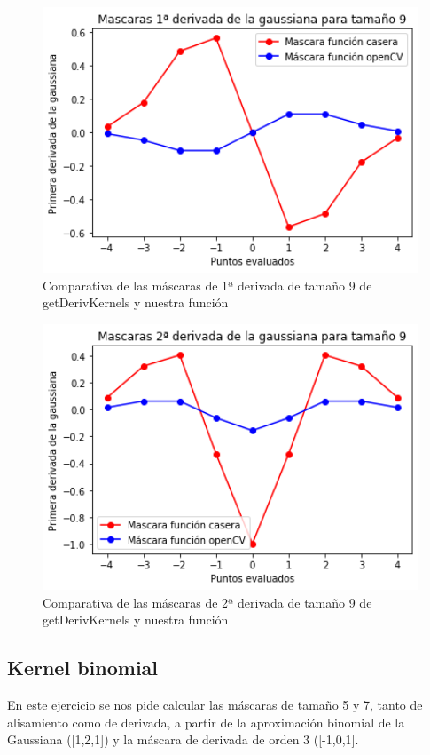 \documentclass[12pt,spanish]{article}
\begin{document}
\begin{figure}[H]
	\centering
	\includegraphics[width=12cm]{./imagenes_memoria/1d_t9.png}
	\caption{Comparativa de las máscaras de 1ª derivada de tamaño 9 de getDerivKernels y nuestra función}
	\label{mask_1d_t9}
\end{figure}

\begin{figure}[H]
	\centering
	\includegraphics[width=12cm]{./imagenes_memoria/2d_t9.png}
	\caption{Comparativa de las máscaras de 2ª derivada de tamaño 9 de getDerivKernels y nuestra función}
	\label{mask_2d_t9}
\end{figure}

\subsection{Kernel binomial}
En este ejercicio se nos pide calcular las máscaras de tamaño 5 y 7, tanto de alisamiento como de derivada, a partir de la aproximación binomial de la Gaussiana ([1,2,1]) y la máscara de derivada de orden 3 ([-1,0,1]. \\
\end{document}
